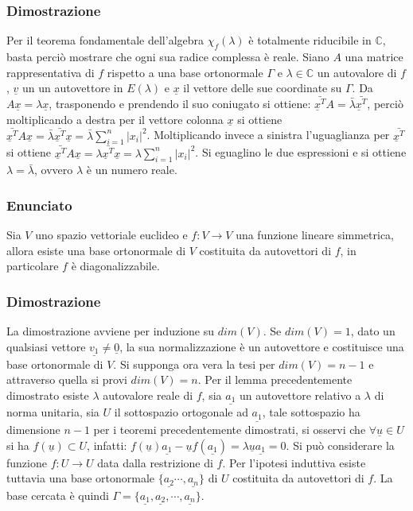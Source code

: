\subsubsection{Dimostrazione}
Per il teorema fondamentale dell'algebra $\chi_f(\lambda)$ \`e totalmente riducibile in $\mathbb{C}$, basta perci\`o mostrare che ogni sua radice complessa \`e reale. Siano $A$
una matrice rappresentativa di $f$ rispetto a una base ortonormale $\Gamma$ e $\lambda\in\mathbb{C}$ un autovalore di $f$, $\underline{v}$ un un autovettore in $E(\lambda)$ e 
$\underline{x}$ il vettore delle sue coordinate su $\Gamma$. Da $A\underline{x}=\lambda\underline{x}$, trasponendo e prendendo il suo coniugato si ottiene: $\bar{\underline{x}^T}
A=\bar{\lambda}\bar{\underline{x}^T}$, perci\`o moltiplicando a destra per il vettore colonna $\underline{x}$ si ottiene $\bar{\underline{x}^T}A\underline{x}=\bar{\lambda}
\bar{\underline{x}^T}\underline{x}=\bar{\lambda}\sum\limits_{i=1}^n|x_i|^2$. Moltiplicando invece a sinistra l'uguaglianza per $\bar{\underline{x}^T}$ si ottiene 
$\bar{\underline{x}^T}A\underline{x}=\lambda\bar{\underline{x}^T}\underline{x}=\lambda\sum\limits_{i=1}^n|x_i|^2$. Si eguaglino le due espressioni e si ottiene $\lambda=
\bar{\lambda}$, ovvero $\lambda$ \`e un numero reale. 
\subsubsection{Enunciato}
Sia $V$ uno spazio vettoriale euclideo e $f:V\rightarrow V$ una funzione lineare simmetrica, allora esiste una base ortonormale di $V$ costituita da autovettori di $f$, in 
particolare $f$ \`e diagonalizzabile.\\
\subsubsection{Dimostrazione}
La dimostrazione avviene per induzione su $dim(V)$. Se $dim(V)=1$, dato un qualsiasi vettore $\underline{v_1}\neq\underline{0}$, la sua normalizzazione \`e un autovettore e 
costituisce una base ortonormale di $V$. Si supponga ora vera la tesi per $dim(V)=n-1$ e attraverso quella si provi $dim(V)=n$. Per il lemma precedentemente dimostrato esiste 
$\lambda$ autovalore reale di $f$, sia $\underline{a_1}$ un autovettore relativo a $\lambda$ di norma unitaria, sia $U$ il sottospazio ortogonale ad $\underline{a_1}$, tale 
sottospazio ha dimensione $n-1$ per i teoremi precedentemente dimostrati, si osservi che $\forall \underline{u}\in U$ si ha $f(\underline{u})\subset U$, infatti:
$f(\underline{u})\underline{a_1}-\underline{u}f(\underline{a_1})=\lambda\underline{u}\underline{a_1}=0$. Si pu\`o considerare la funzione $f:U\rightarrow U$ data dalla 
restrizione di $f$. Per l'ipotesi induttiva esiste tuttavia una base ortonormale $\{\underline{a_2}\cdots,\underline{a_n}\}$ di $U$ costituita da autovettori di $f$. La
base cercata \`e quindi $\Gamma=\{\underline{a_1},\underline{a_2},\cdots,\underline{a_n}\}$.

